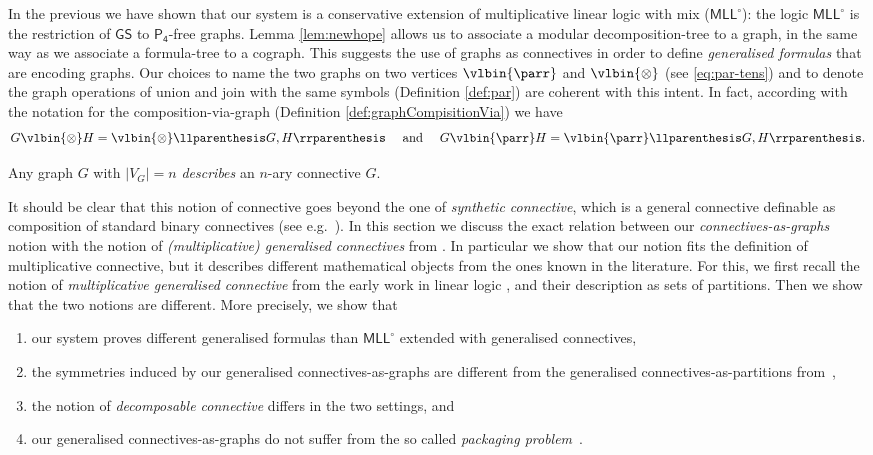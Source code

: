 \documentclass{lmcs} %
\def\GS{\mathsf{GS}}
\newcommand{\connn}[1]{\llparenthesis#1\rrparenthesis}
\def\lpar{\vlbin{\parr}}
\def\ltens{\vlbin{\otimes}}
\def\MLLm{\mathsf{MLL^\circ}}
\def\gG{G}
\def\gH{H}
\newcommand{\vertices}[1][]{V_{#1}}
\newcommand{\sizeof}[1]{|#1|}
\theoremstyle{plain}
\def\pfour{\mathsf{P_4}}
\begin{document}
	
In the previous  we have shown that our system is a conservative  extension of multiplicative linear logic with mix ($\MLLm$): the logic $\MLLm$ is the restriction of $\GS$ to $\pfour$-free graphs.
%
%
%
Lemma \ref{lem:newhope} allows us to associate a modular decomposition-tree to a graph, in the same way as we associate a formula-tree to a cograph.
This suggests the use of graphs as connectives in order to define \emph{generalised formulas} that are encoding graphs.
%
Our choices to name the two graphs on two vertices $\lpar$ and $\ltens$ (see \ref{eq:par-tens})
and to denote the graph operations of union and  join  with the same symbols (Definition \ref{def:par})
are coherent with this intent.
In fact, according with the notation for the composition-via-graph (Definition \ref{def:graphCompisitionVia}) we have 
$$\gG \ltens \gH=\ltens\connn{\gG, \gH} \quad\mbox{ and  }\quad \gG \lpar \gH=\lpar\connn{\gG, \gH}.$$



\begin{defi}
  \label{def:con-as-graph}
  Any graph $\gG$ with $\sizeof{\vertices[\gG]}=n$ \emph{describes} an $n$-ary connective $\gG$.
\end{defi}


It should be clear that this notion of connective goes beyond the one of \emph{synthetic connective}, which is a general connective definable as composition of standard binary connectives (see e.g.~\cite{andreoli:92,girard2000meaning,mil:pim:13}).
In this section we discuss the exact relation between our \emph{connectives-as-graphs} notion  with the notion of \emph{(multiplicative) generalised connectives} from \cite{girard:87:b,danos:regnier:89,mai:19,acc:mai:20}.
% 
In particular we show that our notion fits the definition of multiplicative connective, 
but it describes  different mathematical objects from the ones known in the literature. 
For this, we first recall the notion of \emph{multiplicative generalised connective} 
from the early work in linear logic
\cite{girard:87:b,danos:regnier:89}, and their description as sets of
partitions. 
Then we show that the two notions are different. 
More precisely, we show that
\begin{enumerate}
	\item our system proves different generalised
	formulas than $\MLLm$ extended with generalised connectives,
	
	\item the symmetries induced by our generalised connectives-as-graphs
	are different from the generalised connectives-as-partitions
	from~\cite{girard:87:b,danos:regnier:89,mai:19,acc:mai:20},
	
	\item the notion of \emph{decomposable
	  connective} differs in the two settings, and 
	
	\item our generalised connectives-as-graphs do not suffer from the so called \emph{packaging
	  problem}~\cite{danos:regnier:89}.
\end{enumerate}
\end{document}
